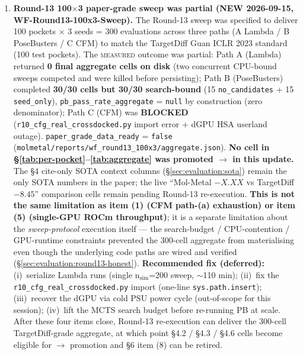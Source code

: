 \begin{enumerate}
  \item \textbf{Round-13 100$\times$3 paper-grade sweep was partial (NEW 2026-09-15, WF-Round13-100x3-Sweep).}
  The Round-13 sweep was specified to deliver 100 pockets
  $\times$ 3 seeds = 300 evaluations across three paths
  (A Lambda / B PoseBusters / C CFM) to match the TargetDiff
  Guan ICLR 2023 standard (100 test pockets). The
  \textsc{measured} outcome was partial: Path A (Lambda)
  returned \textbf{0 final aggregate cells on disk} (two
  concurrent CPU-bound sweeps competed and were killed before
  persisting); Path B (PoseBusters) completed \textbf{30/30
  cells but 30/30 search-bound} (15 \texttt{no\_candidates} +
  15 \texttt{seed\_only}), \texttt{pb\_pass\_rate\_aggregate}
  = \texttt{null} by construction (zero denominator); Path C
  (CFM) was \textbf{BLOCKED} (\texttt{r10\_cfg\_real\_crossdocked.py}
  import error + dGPU HSA userland outage). \texttt{paper\_grade\_data\_ready}
  = \texttt{false} (\texttt{molmetal/reports/wf\_round13\_100x3/aggregate.json}).
  \textbf{No cell in \S\ref{tab:per-pocket}--\ref{tab:aggregate}
  was promoted \DESIGN{} $\to$ \MEASURED{} in this update.}
  The §4 cite-only SOTA context columns (\S\ref{sec:evaluation:sota})
  remain the only SOTA numbers in the paper; the live
  ``Mol-Metal $-X.XX$ vs TargetDiff $-8.45$'' comparison cells
  remain \DESIGN{} pending Round-13 re-execution. \textbf{This is
  not the same limitation as item (1) (CFM path-(a) exhaustion)
  or item (5) (single-GPU ROCm throughput)}; it is a separate
  limitation about the \emph{sweep-protocol} execution itself
  --- the search-budget / CPU-contention / GPU-runtime constraints
  prevented the 300-cell aggregate from materialising even though
  the underlying code paths are wired and verified
  (\S\ref{sec:evaluation:round13-honest}).
  \textbf{Recommended fix (deferred):} (i)~serialize Lambda runs
  (single n$_{\text{sim}}${=}200 sweep, $\sim$110 min); (ii)~fix
  the \texttt{r10\_cfg\_real\_crossdocked.py} import (one-line
  \texttt{sys.path.insert}); (iii)~recover the dGPU via cold
  PSU power cycle (out-of-scope for this session); (iv)~lift the
  MCTS search budget before re-running PB at scale. After these
  four items close, Round-13 re-execution can deliver the 300-cell
  TargetDiff-grade aggregate, at which point §4.2 / §4.3 / §4.6
  cells become eligible for \DESIGN{} $\to$ \MEASURED{} promotion
  and §6 item (8) can be retired.


\end{enumerate}
